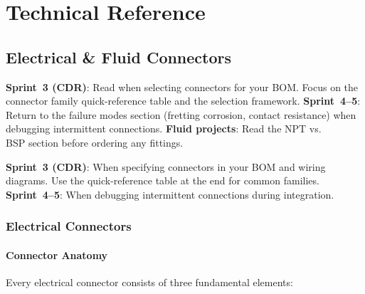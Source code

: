 \documentclass[11pt,letterpaper,twoside,openany]{book}
\begin{document}
\part{Technical Reference}

\chapter{Electrical \& Fluid Connectors}\label{ch:connectors}

\begin{tipbox}
\textbf{Sprint~3 (CDR)}: Read when selecting connectors for your BOM. Focus on the connector family quick-reference table and the selection framework. \textbf{Sprint~4--5}: Return to the failure modes section (fretting corrosion, contact resistance) when debugging intermittent connections. \textbf{Fluid projects}: Read the NPT vs.\\ BSP section before ordering any fittings.
\end{tipbox}


\begin{tipbox}
\textbf{Sprint~3 (CDR)}: When specifying connectors in your BOM and wiring diagrams. Use the quick-reference table at the end for common families. \textbf{Sprint~4--5}: When debugging intermittent connections during integration.
\end{tipbox}



\vspace{1em}




\vspace{1em}

\section{Electrical Connectors}

\subsection{Connector Anatomy}

Every electrical connector consists of three fundamental elements:
\end{document}
